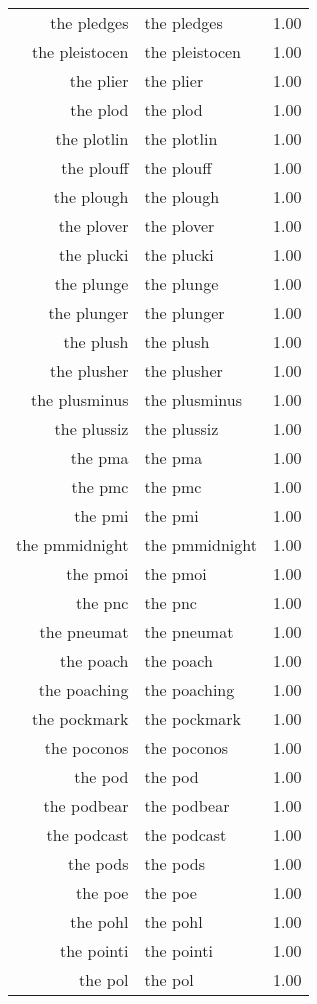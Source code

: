 \begin{table}[ht]
\begin{tabular}{rlr}
  the pledges & the pledges & 1.00 \\ 
  the pleistocen & the pleistocen & 1.00 \\ 
  the plier & the plier & 1.00 \\ 
  the plod & the plod & 1.00 \\ 
  the plotlin & the plotlin & 1.00 \\ 
  the plouff & the plouff & 1.00 \\ 
  the plough & the plough & 1.00 \\ 
  the plover & the plover & 1.00 \\ 
  the plucki & the plucki & 1.00 \\ 
  the plunge & the plunge & 1.00 \\ 
  the plunger & the plunger & 1.00 \\ 
  the plush & the plush & 1.00 \\ 
  the plusher & the plusher & 1.00 \\ 
  the plusminus & the plusminus & 1.00 \\ 
  the plussiz & the plussiz & 1.00 \\ 
  the pma & the pma & 1.00 \\ 
  the pmc & the pmc & 1.00 \\ 
  the pmi & the pmi & 1.00 \\ 
  the pmmidnight & the pmmidnight & 1.00 \\ 
  the pmoi & the pmoi & 1.00 \\ 
  the pnc & the pnc & 1.00 \\ 
  the pneumat & the pneumat & 1.00 \\ 
  the poach & the poach & 1.00 \\ 
  the poaching & the poaching & 1.00 \\ 
  the pockmark & the pockmark & 1.00 \\ 
  the poconos & the poconos & 1.00 \\ 
  the pod & the pod & 1.00 \\ 
  the podbear & the podbear & 1.00 \\ 
  the podcast & the podcast & 1.00 \\ 
  the pods & the pods & 1.00 \\ 
  the poe & the poe & 1.00 \\ 
  the pohl & the pohl & 1.00 \\ 
  the pointi & the pointi & 1.00 \\ 
  the pol & the pol & 1.00 \\ 

\end{tabular}
\end{table}
